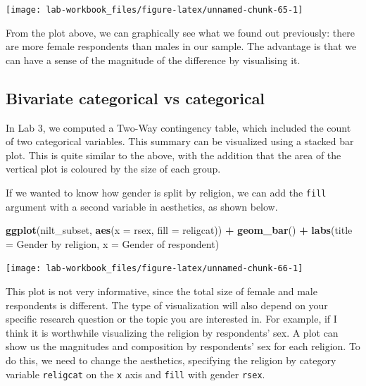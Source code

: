 \documentclass[
]{book}
\newenvironment{Shaded}{\begin{snugshade}}{\end{snugshade}}
\newcommand{\AttributeTok}[1]{\textcolor[rgb]{0.13,0.29,0.53}{#1}}
\newcommand{\FunctionTok}[1]{\textcolor[rgb]{0.13,0.29,0.53}{\textbf{#1}}}
\newcommand{\NormalTok}[1]{#1}
\newcommand{\SpecialCharTok}[1]{\textcolor[rgb]{0.81,0.36,0.00}{\textbf{#1}}}
\newcommand{\StringTok}[1]{\textcolor[rgb]{0.31,0.60,0.02}{#1}}
\begin{document}
\begin{flushleft}\texttt{[image: lab-workbook\_files/figure-latex/unnamed-chunk-65-1]} \end{flushleft}

From the plot above, we can graphically see what we found out previously: there are more female respondents than males in our sample. The advantage is that we can have a sense of the magnitude of the difference by visualising it.

\hypertarget{bivariate-categorical-vs-categorical}{%
\subsection{Bivariate categorical vs categorical}\label{bivariate-categorical-vs-categorical}}

In Lab 3, we computed a Two-Way contingency table, which included the count of two categorical variables. This summary can be visualized using a stacked bar plot. This is quite similar to the above, with the addition that the area of the vertical plot is coloured by the size of each group.

If we wanted to know how gender is split by religion, we can add the \texttt{fill} argument with a second variable in aesthetics, as shown below.

\begin{Shaded}
\begin{Highlighting}[]
\FunctionTok{ggplot}\NormalTok{(nilt\_subset, }\FunctionTok{aes}\NormalTok{(}\AttributeTok{x =}\NormalTok{ rsex, }\AttributeTok{fill =}\NormalTok{ religcat)) }\SpecialCharTok{+}
  \FunctionTok{geom\_bar}\NormalTok{() }\SpecialCharTok{+}
  \FunctionTok{labs}\NormalTok{(}\AttributeTok{title =} \StringTok{\textquotesingle{}Gender by religion\textquotesingle{}}\NormalTok{, }\AttributeTok{x =} \StringTok{\textquotesingle{}Gender of respondent\textquotesingle{}}\NormalTok{)}
\end{Highlighting}
\end{Shaded}

\begin{flushleft}\texttt{[image: lab-workbook\_files/figure-latex/unnamed-chunk-66-1]} \end{flushleft}

This plot is not very informative, since the total size of female and male respondents is different. The type of visualization will also depend on your specific research question or the topic you are interested in. For example, if I think it is worthwhile visualizing the religion by respondents' sex. A plot can show us the magnitudes and composition by respondents' sex for each religion. To do this, we need to change the aesthetics, specifying the religion by category variable \texttt{religcat} on the \texttt{x} axis and \texttt{fill} with gender \texttt{rsex}.
\end{document}
